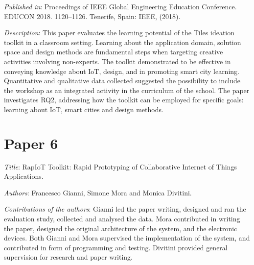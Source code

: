 \emph{Published in}: Proceedings of IEEE Global Engineering Education Conference. EDUCON 2018. 1120--1126. Tenerife, Spain: IEEE, (2018).

\emph{Description}: This paper evaluates the learning potential of the Tiles ideation toolkit in a classroom setting. Learning about the application domain, solution space and design methods are fundamental steps when targeting creative activities involving non-experts. The toolkit demonstrated to be effective in conveying knowledge about IoT, design, and in promoting smart city learning. Quantitative and qualitative data collected suggested the possibility to include the workshop as an integrated activity in the curriculum of the school.
The paper investigates RQ2, addressing how the toolkit can be employed for specific goals: learning about IoT, smart cities and design methods.


\section[P6: RapIoT Toolkit: Rapid Prototyping of Collaborative Internet of Things Applications.][Paper 6]{Paper 6}
\label{paper-6}

\emph{Title}: RapIoT Toolkit: Rapid Prototyping of Collaborative Internet of Things Applications.

\emph{Authors}: Francesco Gianni, Simone Mora and Monica Divitini.

\emph{Contributions of the authors}: Gianni led the paper writing, designed and ran the evaluation study, collected and analysed the data. Mora contributed in writing the paper, designed the original architecture of the system, and the electronic devices. Both Gianni and Mora supervised the implementation of the system, and contributed in form of programming and testing. Divitini provided general supervision for research and paper writing.

